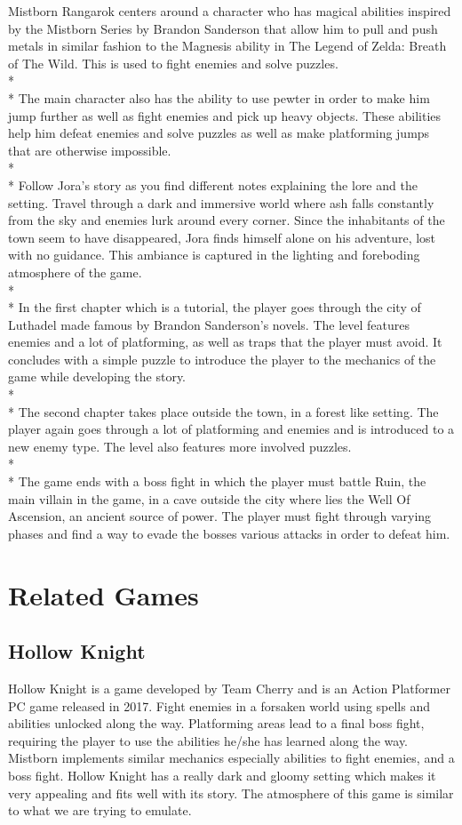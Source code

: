 \documentclass{article}
\begin{document}
Mistborn Rangarok centers around a character who has magical abilities inspired by the Mistborn Series by Brandon Sanderson that allow him to pull and push metals in similar fashion to the Magnesis ability in The Legend of Zelda: Breath of The Wild. This is used to fight enemies and solve puzzles.
\\*\\*
The main character also has the ability to use pewter in order to make him jump further as well as fight enemies and pick up heavy objects. These abilities help him defeat enemies and solve puzzles as well as make platforming jumps that are otherwise impossible.
\\*\\*
Follow Jora's story as you find different notes explaining the lore and the setting. Travel through a dark and immersive world where ash falls constantly from the sky and enemies lurk around every corner. Since the inhabitants of the town seem to have disappeared, Jora finds himself alone on his adventure, lost with no guidance. This ambiance is captured in the lighting and foreboding atmosphere of the game.
\\*\\*
In the first chapter which is a tutorial, the player goes through the city of Luthadel made famous by Brandon Sanderson's novels. The level features enemies and a lot of platforming, as well as traps that the player must avoid. It concludes with a simple puzzle to introduce the player to the mechanics of the game while developing the story.
\\*\\*
The second chapter takes place outside the town, in a forest like setting. The player again goes through a lot of platforming and enemies and is introduced to a new enemy type. The level also features more involved puzzles. 
\\*\\*
The game ends with a boss fight in which the player must battle Ruin, the main villain in the game, in a cave outside the city where lies the Well Of Ascension, an ancient source of power. The player must fight through varying phases and find a way to evade the bosses various attacks in order to defeat him.

\section{Related Games}

\subsection{Hollow Knight}
Hollow Knight is a game developed by Team Cherry and is an Action Platformer PC game released in 2017.
Fight enemies in a forsaken world using spells and abilities unlocked along the way. Platforming areas lead to a final boss fight, requiring the player to use the abilities he/she has learned along the way. Mistborn implements similar mechanics especially abilities to fight enemies, and a boss fight. Hollow Knight has a really dark and gloomy setting which makes it very appealing and fits well with its story. The atmosphere of this game is similar to what we are trying to emulate.
\end{document}
